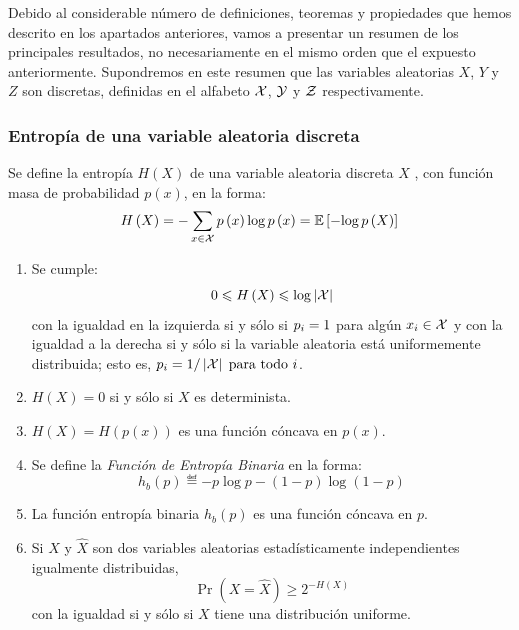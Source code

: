 \begin{Resumen}
\noindent Debido al considerable número de definiciones, teoremas y propiedades que hemos descrito en los apartados anteriores, vamos a presentar un resumen de los principales resultados, no necesariamente en el mismo orden que el expuesto anteriormente. Supondremos en este resumen que las variables aleatorias $X$,  $Y$ y $Z$ son discretas, definidas en el alfabeto $\mathcal{X}$, $\mathcal{Y}$  y  $\mathcal{Z}$ respectivamente. 

\subsubsection*{Entropía de una variable aleatoria discreta}
Se define la entropía $H\left( {X} \right)$ de una variable aleatoria discreta $X$ , con función masa de probabilidad $p\left( {x} \right)$, en la forma:
\begin{equation*}
H\left( {X} \right)= -\sum_{x\in \mathcal{X} }{p\left( {x} \right)\log p\left( {x} \right)}=\mathbb{E}\left[ -{\log p\left( {X} \right)} \right]
\end{equation*}
\begin{enumerate}
\item Se cumple:
\begin{equation*}
 0\leqslant H\left( {X} \right) \leqslant \log \left| \mathcal{X}\right|
\end{equation*}
 con la igualdad en la izquierda si y sólo si $p\sb{i}=1$ para algún $x_{i} \in \mathcal{X}$ y con la igualdad a la derecha si y sólo si la variable aleatoria está uniformemente distribuida; esto es, $p\sb{i}=1/\left| \mathcal{X}\right| \; \mbox{para todo }i$.
 \item $H\left( {X} \right)=0$ si y sólo si $X$ es determinista.
\item $H\left( {X} \right)=H\left( {p\left( {x} \right)} \right)$ es una función cóncava en $p\left( {x} \right)$.
\item Se define la \emph{Función de Entropía Binaria} en la forma:
\begin{equation*}
h_{b}\left( {p} \right) \eqdef -p\log p-\left( {1-p} \right)\log\left( {1-p} \right)\end{equation*}
\item La función entropía binaria $h_{b}\left( {p} \right)$ es una función cóncava en $p$.
\item Si $X$ y $\hat X$ son dos variables aleatorias estadísticamente independientes igualmente distribuidas, 
\begin{equation*}
\Pr\left( {X=\hat X} \right) \ge 2^{-H\left( {X} \right)}
\end{equation*}
con la igualdad si y sólo si $X$ tiene una distribución uniforme.
\end{enumerate}


\end{Resumen}
